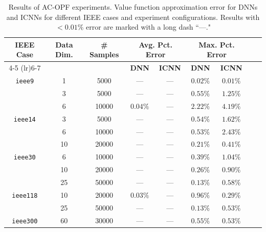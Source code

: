 \documentclass[10pt]{article} %
\theoremstyle{plain}
\theoremstyle{definition}
\theoremstyle{remark}
\begin{document}
\begin{table}[t]
\centering
\caption{Results of AC-OPF experiments. Value function approximation error for DNNs and ICNNs for different IEEE cases and experiment configurations. Results with $<0.01\%$ error are marked with a long dash ``---."}
\begin{tabular}{*{3}{c} *{6}{c}}
\toprule
\textbf{IEEE Case} & \textbf{Data Dim.} & \textbf{\# Samples} &
\multicolumn{2}{c}{\textbf{Avg. Pct. Error}} &
\multicolumn{2}{c}{\textbf{Max. Pct. Error}} \\
\cmidrule(lr){4-5} \cmidrule(lr){6-7}
& & & \textbf{DNN} & \textbf{ICNN} & \textbf{DNN} & \textbf{ICNN} \\
\midrule
\texttt{ieee9}   & 1  & 5000  & ---      & ---            & $0.02\%$ & $0.01\%$       \\
         & 3  & 5000  & ---      & ---            & $0.55\%$ & $1.25\%$       \\
         & 6  & 10000 & $0.04\%$ & ---            & $2.22\%$ & $4.19\%$       \\
\addlinespace \hline \addlinespace
\texttt{ieee14} & 3  & 5000  & ---      & ---            & $0.54\%$ & $1.62\%$       \\
         & 6  & 10000 & ---      & ---            & $0.53\%$ & $2.43\%$       \\
         & 10 & 20000 & ---      & ---            & $0.21\%$ & $0.41\%$       \\
\addlinespace \hline \addlinespace
\texttt{ieee30}  & 6  & 10000 & ---      & ---            & $0.39\%$ & $1.04\%$       \\
         & 10 & 20000 & ---      & ---            & $0.26\%$ & $0.90\%$       \\
         & 25 & 50000 & ---      & ---            & $0.13\%$ & $0.58\%$       \\
\addlinespace \hline \addlinespace
\texttt{ieee118} & 10 & 20000 & $0.03\%$ & ---            & $0.96\%$ & $0.29\%$       \\
         & 25 & 50000 & ---      & ---            & $0.13\%$ & $0.53\%$       \\
\addlinespace \hline \addlinespace
\texttt{ieee300} & 60 & 30000 & ---      & ---            & $0.55\%$ & $0.53\%$    \\
\bottomrule
\end{tabular}
\label{tab:ACOPF-results}

\end{table}
\end{document}
